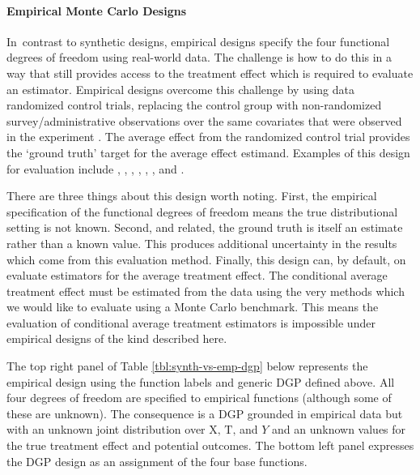 \documentclass[../main.tex]{subfiles}
\begin{document}
\vspace{\baselineskip}
\paragraph*{Empirical Monte Carlo Designs}\par


\vspace{\baselineskip}
In\ contrast to synthetic designs, empirical designs specify the four functional degrees of freedom using real-world data. The challenge is how to do this in a way that still provides access to the treatment effect which is required to evaluate an estimator. Empirical designs overcome this challenge by using data randomized control trials, replacing the control group with non-randomized survey/administrative observations over the same covariates that were observed in the experiment \cite{Huber2013TheScore}. The average effect from the randomized control trial provides the ‘ground truth’ target for the average effect estimand. Examples of this design for evaluation include \cite{Lalonde1986EvaluatingData}, \cite{Fraker1987ThePrograms}, \cite{Friedlander1995EvaluatingMethods}, \cite{Heckman1998MatchingEstimator}, \cite{Dehejia1999CausalPrograms}, \cite{A.Smith2005DoesEstimators}, and \cite{Flores2009EvaluatingData}.\par

\vspace{\baselineskip}
There are three things about this design worth noting. First, the empirical specification of the functional degrees of freedom means the true distributional setting is not known. Second, and related, the ground truth is itself an estimate rather than a known value. This produces additional uncertainty in the results which come from this evaluation method. Finally, this design can, by default, on evaluate estimators for the average treatment effect. The conditional average treatment effect must be estimated from the data using the very methods which we would like to evaluate using a Monte Carlo benchmark. This means the evaluation of conditional average treatment estimators is impossible under empirical designs of the kind described here.\par


\vspace{\baselineskip}
The top right panel of Table \ref{tbl:synth-vs-emp-dgp} below represents the empirical design using the function labels and generic DGP defined above. All four degrees of freedom are specified to empirical functions (although some of these are unknown). The consequence is a DGP grounded in empirical data but with an unknown joint distribution over  \( \text{X, T,} \) and  \( Y \) and an unknown values for the true treatment effect and potential outcomes. The bottom left panel expresses the \cite{Lalonde1986EvaluatingData} DGP design as an assignment of the four base functions.\par
\end{document}
